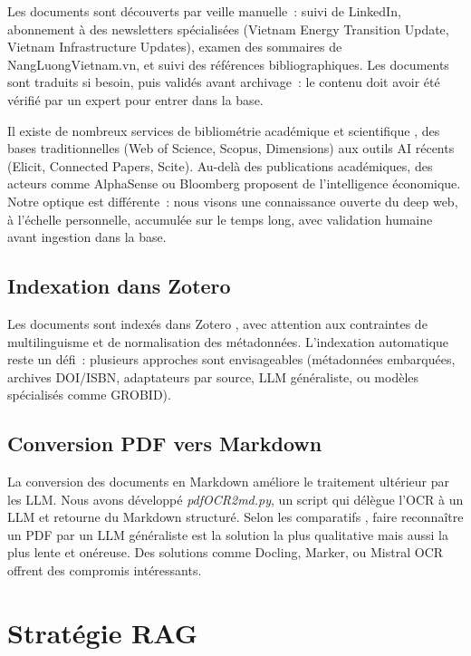 \documentclass[a4paper,11pt]{report}
\begin{document}
Les documents sont découverts par veille manuelle~: suivi de LinkedIn, abonnement à des newsletters spécialisées (Vietnam Energy Transition Update, Vietnam Infrastructure Updates), examen des sommaires de NangLuongVietnam.vn, et suivi des références bibliographiques. Les documents sont traduits si besoin, puis validés avant archivage~: le contenu doit avoir été vérifié par un expert pour entrer dans la base.

Il existe de nombreux services de bibliométrie académique et scientifique \citep{5WPNTHNM}, des bases traditionnelles (Web of Science, Scopus, Dimensions) aux outils AI récents (Elicit, Connected Papers, Scite). Au-delà des publications académiques, des acteurs comme AlphaSense ou Bloomberg proposent de l'intelligence économique. Notre optique est différente~: nous visons une connaissance ouverte du deep web, à l'échelle personnelle, accumulée sur le temps long, avec validation humaine avant ingestion dans la base.

\subsection{Indexation dans Zotero}

Les documents sont indexés dans Zotero \citep{9666795Z}, avec attention aux contraintes de multilinguisme et de normalisation des métadonnées. L'indexation automatique reste un défi~: plusieurs approches sont envisageables (métadonnées embarquées, archives DOI/ISBN, adaptateurs par source, LLM généraliste, ou modèles spécialisés comme GROBID).

\subsection{Conversion PDF vers Markdown}\label{sec:pdf-to-md}

La conversion des documents en Markdown améliore le traitement ultérieur par les LLM. Nous avons développé \emph{pdfOCR2md.py}, un script qui délègue l'OCR à un LLM et retourne du Markdown structuré. Selon les comparatifs \citep{ULQGRISS,RM4KCTEG}, faire reconnaître un PDF par un LLM généraliste est la solution la plus qualitative mais aussi la plus lente et onéreuse. Des solutions comme Docling, Marker, ou Mistral OCR offrent des compromis intéressants.

\section{Stratégie RAG}
\end{document}
